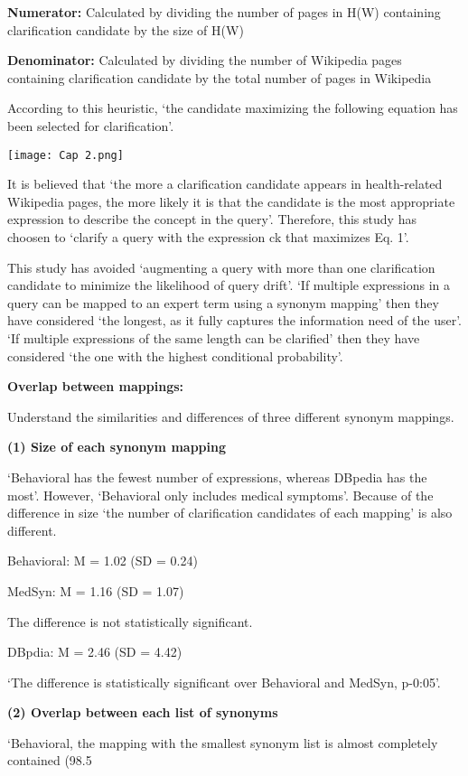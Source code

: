 \documentclass[]{article}
\begin{document}
\textbf{Numerator:} Calculated by dividing the number of pages in H(W) containing clarification candidate by the size of H(W)

\textbf{Denominator: } Calculated by dividing the number of Wikipedia pages containing clarification candidate by the total number of pages in Wikipedia

According to this heuristic, ‘the candidate maximizing the following equation has been selected for clarification’.

\texttt{[image: Cap 2.png]}

It is believed that ‘the more a clarification candidate appears in health-related Wikipedia pages, the more likely it is that the candidate is the most appropriate expression to describe the concept in the query’. Therefore, this study has choosen to ‘clarify a query with the expression ck that maximizes Eq. 1’.
   
This study has avoided ‘augmenting a query with more than one clarification candidate to minimize the likelihood of query drift’. ‘If multiple expressions in a query can be mapped to an expert term using a synonym mapping’ then they have considered ‘the longest, as it fully captures the information need of the user’. ‘If multiple expressions of the same length can be clarified’ then they have considered ‘the one with the highest conditional probability’.

\textbf{Overlap between mappings:}

Understand the similarities and differences of three different synonym mappings. 

\textbf{(1)	Size of each synonym mapping}

‘Behavioral has the fewest number of expressions, whereas DBpedia has the most’. However, ‘Behavioral only includes medical symptoms’. Because of the difference in size ‘the number of clarification candidates of each mapping’ is also different. 

Behavioral: M = 1.02 (SD = 0.24)

MedSyn: M = 1.16 (SD = 1.07)

The difference is not statistically significant.

DBpdia: M = 2.46 (SD = 4.42)

‘The difference is statistically significant over Behavioral and MedSyn, p-0:05’. 

\textbf{(2)	Overlap between each list of synonyms}

‘Behavioral, the mapping with the smallest synonym list is almost completely contained (98.5 %
\end{document}
